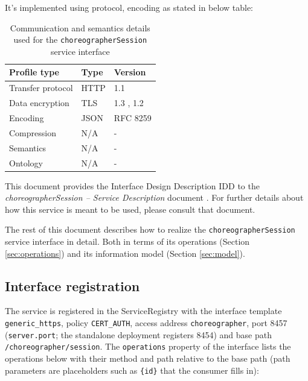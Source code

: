 \documentclass[a4paper]{arrowhead}
\begin{document}
It's implemented using protocol, encoding as stated in below table:
\begin{table}[ht!]
  \centering
  \begin{tabular}{|l|l|l|}
    \hline
    \rowcolor{gray!33} Profile type & Type & Version \\ \hline
    Transfer protocol & HTTP & 1.1 \cite{rfc9112} \\ \hline
    Data encryption & TLS & 1.3 \cite{rfc8446}, 1.2 \cite{rfc5246} \\ \hline
    Encoding & JSON & RFC 8259 \cite{rfc8259} \\ \hline
    Compression & N/A & - \\ \hline
    Semantics & N/A & - \\ \hline
    Ontology & N/A & - \\ \hline
  \end{tabular}
  \caption{Communication and semantics details used for the \texttt{choreographer\allowbreak{}Session} service interface}
  \label{tab:comunication_semantics_profile}
\end{table}

This document provides the Interface Design Description IDD to the \textit{choreographerSession -- Service Description} document \cite{cho-choreographerSession-sd}.
For further details about how this service is meant to be used, please consult that document.

The rest of this document describes how to realize the \texttt{choreographer\allowbreak{}Session} service
interface in detail. Both in terms of its operations (Section \ref{sec:operations}) and its information model (Section \ref{sec:model}).

\subsection{Interface registration}

The service is registered in the ServiceRegistry with the interface template \texttt{generic\_\allowbreak{}https}, policy \texttt{CERT\_\allowbreak{}AUTH}, access address \texttt{choreographer}, port 8457 (\texttt{server.\allowbreak{}port}; the standalone deployment registers 8454) and base path \texttt{/\allowbreak{}choreographer/\allowbreak{}session}. The \texttt{operations} property of the interface lists the operations below with their method and path relative to the base path (path parameters are placeholders such as \texttt{\{id\}} that the consumer fills in):
\end{document}
